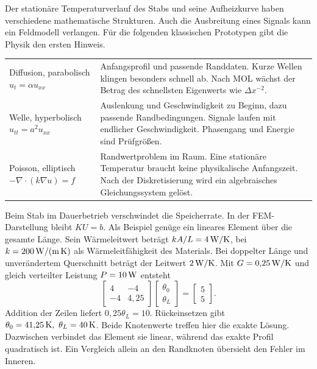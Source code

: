 Der stationäre Temperaturverlauf des Stabs und seine Aufheizkurve haben verschiedene mathematische Strukturen. Auch die Ausbreitung eines Signals kann ein Feldmodell verlangen. Für die folgenden klassischen Prototypen gibt die Physik den ersten Hinweis.
{\tblstart\begin{tabularx}{\linewidth}{@{}P{27mm}Y@{}}\toprule
{}&\\\midrule
Diffusion, parabolisch \(u_t=\alpha u_{xx}\)&Anfangsprofil und passende Randdaten. Kurze Wellen klingen besonders schnell ab. Nach MOL wächst der Betrag des schnellsten Eigenwerts wie \(\Delta x^{-2}\).\\
Welle, hyperbolisch \(u_{tt}=a^2u_{xx}\)&Auslenkung und Geschwindigkeit zu Beginn, dazu passende Randbedingungen. Signale laufen mit endlicher Geschwindigkeit. Phasengang und Energie sind Prüfgrößen.\\
Poisson, elliptisch \(-\nabla\cdot(k\nabla u)=f\)&Randwertproblem im Raum. Eine stationäre Temperatur braucht keine physikalische Anfangszeit. Nach der Diskretisierung wird ein algebraisches Gleichungssystem gelöst.\\\bottomrule
\end{tabularx}\par}
Beim Stab im Dauerbetrieb verschwindet die Speicherrate. In der FEM-Darstellung bleibt \(KU=b\). Als Beispiel genüge ein lineares Element über die gesamte Länge. Sein Wärmeleitwert beträgt \(kA/L=4\,\mathrm{W/K}\), bei \(k=200\,\mathrm{W/(m\,K)}\) als Wärmeleitfähigkeit des Materials. Bei doppelter Länge und unverändertem Querschnitt beträgt der Leitwert \(2\,\mathrm{W/K}\). Mit \(G=0{,}25\,\mathrm{W/K}\) und gleich verteilter Leistung \(P=10\,\mathrm{W}\) entsteht
\[
 \begin{bmatrix}4&-4\\-4&4{,}25\end{bmatrix}
 \begin{bmatrix}\theta_0\\ \theta_L\end{bmatrix}
 =\begin{bmatrix}5\\5\end{bmatrix}.
\]
Addition der Zeilen liefert \(0{,}25\theta_L=10\). Rückeinsetzen gibt \(\theta_0=41{,}25\unitm K,\ \theta_L=40\unitm K\). Beide Knotenwerte treffen hier die exakte Lösung. Dazwischen verbindet das Element sie linear, während das exakte Profil quadratisch ist. Ein Vergleich allein an den Randknoten übersieht den Fehler im Inneren.

